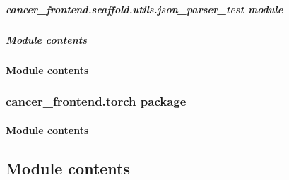 \documentclass[letterpaper,10pt,english]{sphinxmanual}
\begin{document}
\subparagraph{cancer\_frontend.scaffold.utils.json\_parser\_test module}
\label{\detokenize{cancer_frontend.scaffold.utils:cancer-frontend-scaffold-utils-json-parser-test-module}}

\subparagraph{Module contents}
\label{\detokenize{cancer_frontend.scaffold.utils:module-cancer_frontend.scaffold.utils}}\label{\detokenize{cancer_frontend.scaffold.utils:module-contents}}

\paragraph{Module contents}
\label{\detokenize{cancer_frontend.scaffold:module-cancer_frontend.scaffold}}\label{\detokenize{cancer_frontend.scaffold:module-contents}}

\subsubsection{cancer\_frontend.torch package}
\label{\detokenize{cancer_frontend.torch:cancer-frontend-torch-package}}\label{\detokenize{cancer_frontend.torch::doc}}

\paragraph{Module contents}
\label{\detokenize{cancer_frontend.torch:module-cancer_frontend.torch}}\label{\detokenize{cancer_frontend.torch:module-contents}}

\subsection{Module contents}
\label{\detokenize{cancer_frontend:module-cancer_frontend}}\label{\detokenize{cancer_frontend:module-contents}}
\end{document}
